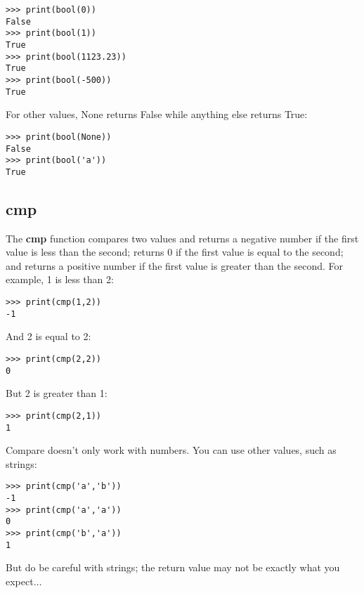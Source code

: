 \begin{Verbatim}[frame=single]
>>> print(bool(0))
False
>>> print(bool(1))
True
>>> print(bool(1123.23))
True
>>> print(bool(-500))
True
\end{Verbatim}

For other values, None returns False while anything else returns True:

\begin{Verbatim}[frame=single]
>>> print(bool(None))
False
>>> print(bool('a'))
True
\end{Verbatim}

\subsection*{cmp}

The \textbf{cmp} function compares two values and returns a negative number if the first value is less than the second; returns 0 if the first value is equal to the second; and returns a positive number if the first value is greater than the second. For example, 1 is less than 2:

\begin{Verbatim}[frame=single]
>>> print(cmp(1,2))
-1
\end{Verbatim}

\noindent
And 2 is equal to 2:

\begin{Verbatim}[frame=single]
>>> print(cmp(2,2))
0
\end{Verbatim}

\noindent
But 2 is greater than 1:

\begin{Verbatim}[frame=single]
>>> print(cmp(2,1))
1
\end{Verbatim}

\noindent
Compare doesn't only work with numbers. You can use other values, such as strings:

\begin{Verbatim}[frame=single]
>>> print(cmp('a','b'))
-1
>>> print(cmp('a','a'))
0
>>> print(cmp('b','a'))
1
\end{Verbatim}

\noindent
But do be careful with strings; the return value may not be exactly what you expect$\ldots$

